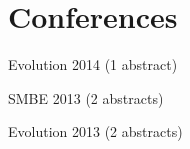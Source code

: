 \documentclass[letterpaper]{article}
\renewenvironment{itemize}{
  \begin{list}{}{
    \setlength{\leftmargin}{1.5em}
  }
}{
  \end{list}
}
\begin{document}


\section*{Conferences}
\begin{itemize}
 \item Evolution 2014 (1 abstract)
 \item SMBE 2013 (2 abstracts)
 \item Evolution 2013 (2 abstracts)
\end{itemize}
\end{document}
